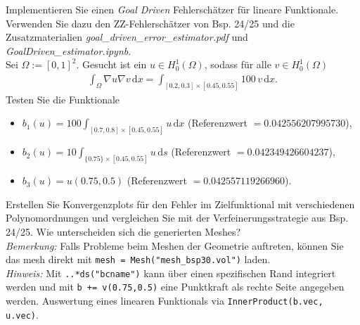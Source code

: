 
\begin{exercise}

Implementieren Sie einen \textit{Goal Driven} Fehlerschätzer für lineare
Funktionale. Verwenden Sie dazu den ZZ-Fehlerschätzer von Bsp. 24/25 und die
Zusatzmaterialien \textit{goal\_driven\_error\_estimator.pdf} und
\textit{GoalDriven\_estimator.ipynb}. \\
Sei $\Omega := [0,1]^2$. Gesucht ist ein $u \in H_0^1(\Omega)$, sodass für alle
$v \in H_0^1(\Omega)$
\begin{align}
  \int_\Omega \nabla u \nabla v\, \mathrm{d}x = \int_{[0.2,0.3]\times [0.45,0.55]}100\, v\, \mathrm{d}x.
\end{align}
Testen Sie die Funktionale
\begin{itemize}
  \item $b_1(u) = 100\int_{[0.7,0.8]\times[0.45,0.55]}u\, \mathrm{d}x$ \quad
  (Referenzwert $= 0.042556207995730$),
  \item $b_2(u) = 10\int_{\{0.75\}\times[0.45,0.55]}u\, \mathrm{d}s$ \quad
  (Referenzwert $= 0.042349426604237$),
  \item $b_3(u) = u(0.75,0.5)$ \quad
  (Referenzwert $= 0.042557119266960$).
\end{itemize}
Erstellen Sie Konvergenzplots für den Fehler im Zielfunktional mit verschiedenen
Polynomordnungen und vergleichen Sie mit der Verfeinerungsstrategie aus Bsp. 24/25.
Wie unterscheiden sich die generierten Meshes? \\
\textit{Bemerkung:} Falls Probleme beim Meshen der Geometrie auftreten, können Sie
das mesh direkt mit \texttt{mesh = Mesh("{}mesh\_bsp30.vol"{})} laden. \\
\textit{Hinweis:} Mit \texttt{..*ds("{}bcname"{})} kann über einen spezifischen Rand
integriert werden und mit \texttt{b += v(0.75,0.5)} eine Punktkraft als rechte
Seite angegeben werden. Auswertung eines linearen Funktionals via
\texttt{InnerProduct(b.vec, u.vec)}.
\end{exercise}


\begin{solution}

\phantom{}

\end{solution}

